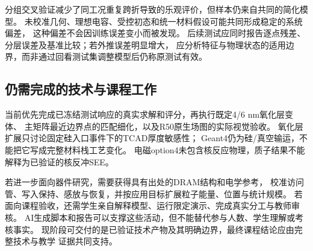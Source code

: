 分组交叉验证减少了同工况重复跨折导致的乐观评价，但样本仍来自共同的简化模型。
未校准几何、理想电容、受控初态和统一材料假设可能共同形成稳定的系统偏差，
这种偏差不会因训练误差变小而被发现。
后续测试应同时报告逐点残差、分层误差及基准比较；若外推误差明显增大，
应分析特征与物理状态的适用边界，而非通过回看测试集调整模型后仍称原测试有效。

\subsection{仍需完成的技术与课程工作}
当前优先完成已冻结测试响应的真实求解和评分，再执行既定4/6 nm氧化层变体、
主矩阵最近边界点的匹配细化，以及R50原生场图的实际视觉验收。
氧化层扩展只讨论固定硅入口事件下的TCAD厚度敏感性；
Geant4仍为硅/真空输运，不能把它写成完整材料栈工艺变化。
电磁option4未包含核反应物理，质子结果不能解释为已验证的核反冲SEE。

若进一步面向器件研究，需要获得具有出处的DRAM结构和电学参考，
校准访问管、写入保持、感放与恢复，并按应用目标扩展粒子能量、位置与统计规模。
若面向课程验收，还需学生亲自解释模型、运行限定演示、完成真实分工与教师审核。
AI生成脚本和报告可以支撑这些活动，但不能替代参与人数、学生理解或考核事实。
现阶段可交付的是已验证技术产物及其明确边界，最终课程结论应由完整技术与教学
证据共同支持。
